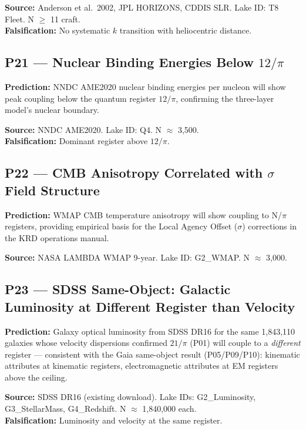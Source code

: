 \documentclass[12pt, letterpaper]{article}
\begin{document}
\medskip
\textbf{Source:} Anderson et al.\ 2002, JPL HORIZONS, CDDIS SLR. Lake ID:
T8 Fleet. N $\geq$ 11 craft.\\
\textbf{Falsification:} No systematic $k$ transition with heliocentric distance.

\subsection*{P21 --- Nuclear Binding Energies Below $12/\pi$}

\textbf{Prediction:} NNDC AME2020 nuclear binding energies per nucleon will
show peak coupling below the quantum register $12/\pi$, confirming the
three-layer model's nuclear boundary.

\medskip
\textbf{Source:} NNDC AME2020. Lake ID: Q4. N $\approx$ 3,500.\\
\textbf{Falsification:} Dominant register above $12/\pi$.

\subsection*{P22 --- CMB Anisotropy Correlated with $\sigma$ Field Structure}

\textbf{Prediction:} WMAP CMB temperature anisotropy will show coupling to
N/$\pi$ registers, providing empirical basis for the Local Agency Offset
($\sigma$) corrections in the KRD operations manual.

\medskip
\textbf{Source:} NASA LAMBDA WMAP 9-year. Lake ID: G2\_WMAP.
N $\approx$ 3,000.

\subsection*{P23 --- SDSS Same-Object: Galactic Luminosity at Different Register than Velocity}

\textbf{Prediction:} Galaxy optical luminosity from SDSS DR16 for the same
1,843,110 galaxies whose velocity dispersions confirmed $21/\pi$ (P01) will
couple to a \textit{different} register --- consistent with the Gaia same-object
result (P05/P09/P10): kinematic attributes at kinematic registers, electromagnetic
attributes at EM registers above the ceiling.

\medskip
\textbf{Source:} SDSS DR16 (existing download). Lake IDs: G2\_Luminosity,
G3\_StellarMass, G4\_Redshift. N $\approx$ 1,840,000 each.\\
\textbf{Falsification:} Luminosity and velocity at the same register.
\end{document}
